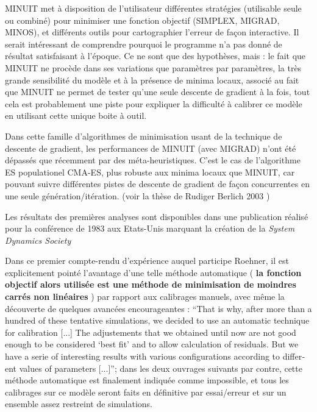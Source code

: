 MINUIT met à disposition de l’utilisateur différentes stratégies (utilisable seule ou combiné) pour minimiser une fonction objectif (SIMPLEX, MIGRAD, MINOS), et différents outils pour cartographier l’erreur de façon interactive.  Il serait intéressant de comprendre pourquoi le programme n’a pas donné de résultat satisfaisant à l’époque. Ce ne sont que des hypothèses, mais : le fait que MINUIT ne procède dans ses variations que paramètres par paramètres, la très grande sensibilité du modèle et à la présence de minima locaux, associé au fait que MINUIT ne permet de tester qu’une seule descente de gradient à la fois, tout cela est probablement une piste pour expliquer la difficulté à calibrer ce modèle en utilisant cette unique boite à outil.

Dans cette famille d’algorithmes de minimisation usant de la technique de descente de gradient, les performances de MINUIT (avec MIGRAD) n’ont été dépassés que récemment par des méta-heuristiques. C’est le cas de l’algorithme ES populationel CMA-ES, plus robuste aux minima locaux que MINUIT, car pouvant suivre différentes pistes de descente de gradient de façon concurrentes en une seule génération/itération. \autocite{Berlich2003} (voir la thèse de Rudiger Berlich 2003 )

Les résultats des premières analyses sont disponibles dans une publication \autocite{Pumain1983} réalisé pour la conférence de 1983 aux Etats-Unis marquant la création \autocite{Andersen2007} de la \textit{System Dynamics Society}

Dans ce premier compte-rendu d'expérience auquel participe Roehner, il est explicitement pointé l’avantage d’une telle méthode automatique ( \textbf{la fonction objectif alors utilisée est une méthode de minimisation de moindres carrés non linéaires }) par rapport aux calibrages manuels, avec même la découverte de quelques avancées encourageantes : \foreignquote{english}{That is why, after more than a hundred of these tentative simulations, we decided to use an automatic technique for calibration [...] The adjustements that we obtained until now are not good enough to be considered \enquote{best fit} and to allow calculation of residuals. But we have a serie of interesting results with various configurations according to different values of parameters [...]}; dans les deux ouvrages suivants par contre, cette méthode automatique est finalement indiquée comme impossible, et tous les calibrages sur ce modèle seront faits en définitive par essai/erreur et sur un ensemble assez restreint de simulations.

